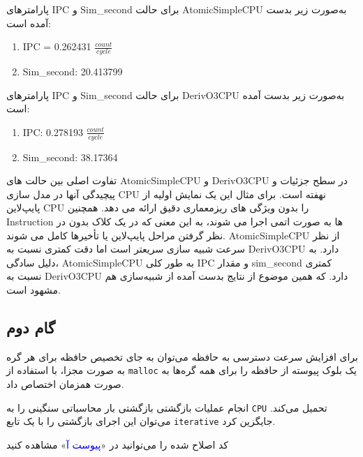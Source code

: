 \documentclass[12pt]{exam}
\begin{document}
\begin{multicols}{1}
	پارامتر‌های IPC و Sim\_second برای حالت AtomicSimpleCPU به‌صورت زیر بدست آمده است:
	\begin{latin}
		\begin{enumerate}
			\item IPC = 0.262431 $\frac{count}{cycle}$
			\item Sim\_second: 20.413799
		\end{enumerate} 
	\end{latin}
	
	پارامتر‌های IPC و Sim\_second برای حالت DerivO3CPU به‌صورت زیر بدست آمده است:
	\begin{latin}
		\begin{enumerate}
			\item IPC: 0.278193 $\frac{count}{cycle}$
			\item Sim\_second: 38.17364
		\end{enumerate} 
	\end{latin}
	
	تفاوت اصلی بین حالت های AtomicSimpleCPU و DerivO3CPU در سطح جزئیات و پیچیدگی آنها در مدل سازی CPU نهفته است. برای مثال این یک نمایش اولیه از پایپ‌لاین CPU را بدون ویژگی های ریزمعماری دقیق ارائه می دهد. همچنین Instruction ها به صورت اتمی اجرا می شوند، به این معنی که در یک کلاک بدون در نظر گرفتن مراحل پایپ‌لاین یا تأخیرها کامل می شوند. AtomicSimpleCPU از نظر سرعت شبیه سازی سریعتر است اما دقت کمتری نسبت به DerivO3CPU دارد. به دلیل سادگی، AtomicSimpleCPU به طور کلی IPC و مقدار sim\_second کمتری نسبت به DerivO3CPU دارد. که همین موضوع از نتایج بدست آمده از شبیه‌سازی هم مشهود است.
	
	
	
	
	
	
	
	\subsection{گام دوم}
	برای افزایش سرعت دسترسی به حافظه می‌توان به جای تخصیص حافظه برای هر گره به صورت مجزا، با استفاده از \texttt{malloc} یک بلوک پیوسته از حافظه را برای همه گره‌ها به صورت همزمان اختصاص داد.
	
 انجام عملیات بازگشتی بازگشتی بار محاسباتی سنگینی را به \texttt{CPU} تحمیل می‌کند. می‌توان این اجرای بازگشتی را با یک تابع \texttt{iterative} جایگزین کرد.
 
 کد اصلاح شده را می‌توانید در «\textcolor{blue}{پیوست آ}» مشاهده کنید
	
	
	
	
	
	
	

\end{multicols}
\end{document}
